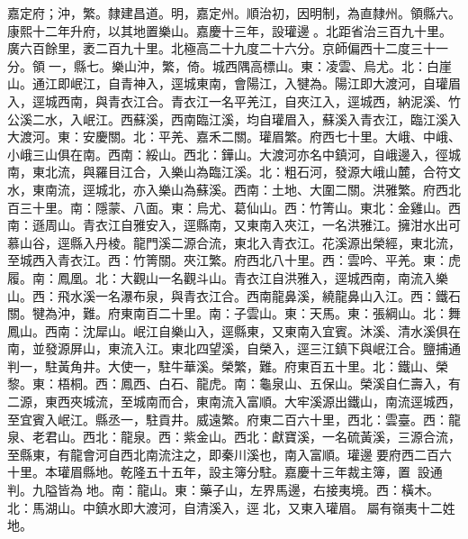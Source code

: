 \begin{pinyinscope}
嘉定府；沖，繁。隸建昌道。明，嘉定州。順治初，因明制，為直隸州。領縣六。康熙十二年升府，以其地置樂山。嘉慶十三年，設瓘邊。北距省治三百九十里。廣六百餘里，袤二百九十里。北極高二十九度二十六分。京師偏西十二度三十一分。領一，縣七。樂山沖，繁，倚。城西隅高標山。東：凌雲、烏尤。北：白崖山。通江即岷江，自青神入，逕城東南，會陽江，入犍為。陽江即大渡河，自瓘眉入，逕城西南，與青衣江合。青衣江一名平羌江，自夾江入，逕城西，納泥溪、竹公溪二水，入岷江。西蘇溪，西南臨江溪，均自瓘眉入，蘇溪入青衣江，臨江溪入大渡河。東：安慶關。北：平羌、嘉禾二關。瓘眉繁。府西七十里。大峨、中峨、小峨三山俱在南。西南：綏山。西北：鏵山。大渡河亦名中鎮河，自峨邊入，徑城南，東北流，與羅目江合，入樂山為臨江溪。北：粗石河，發源大峨山麓，合符文水，東南流，逕城北，亦入樂山為蘇溪。西南：土地、大圍二關。洪雅繁。府西北百三十里。南：隱蒙、八面。東：烏尤、葛仙山。西：竹箐山。東北：金雞山。西南：遜周山。青衣江自雅安入，逕縣南，又東南入夾江，一名洪雅江。擁泔水出可慕山谷，逕縣入丹棱。龍門溪二源合流，東北入青衣江。花溪源出榮經，東北流，至城西入青衣江。西：竹箐關。夾江繁。府西北八十里。西：雲吟、平羌。東：虎履。南：鳳凰。北：大觀山一名觀斗山。青衣江自洪雅入，逕城西南，南流入樂山。西：飛水溪一名瀑布泉，與青衣江合。西南龍鼻溪，繞龍鼻山入江。西：鐵石關。犍為沖，難。府東南百二十里。南：子雲山。東：天馬。東：張綱山。北：舞鳳山。西南：沈犀山。岷江自樂山入，逕縣東，又東南入宜賓。沐溪、清水溪俱在南，並發源屏山，東流入江。東北四望溪，自榮入，逕三江鎮下與岷江合。鹽捕通判一，駐黃角井。大使一，駐牛華溪。榮繁，難。府東百五十里。北：鐵山、榮黎。東：梧桐。西：鳳西、白石、龍虎。南：龜泉山、五保山。榮溪自仁壽入，有二源，東西夾城流，至城南而合，東南流入富順。大牢溪源出鐵山，南流逕城西，至宜賓入岷江。縣丞一，駐貢井。威遠繁。府東二百六十里，西北：雲臺。西：龍泉、老君山。西北：龍泉。西：紫金山。西北：獻寶溪，一名硫黃溪，三源合流，至縣東，有龍會河自西北南流注之，即秦川溪也，南入富順。瓘邊要府西二百六十里。本瓘眉縣地。乾隆五十五年，設主簿分駐。嘉慶十三年裁主簿，置，設通判。九隘皆為地。南：龍山。東：藥子山，左界馬邊，右接夷境。西：橫木。北：馬湖山。中鎮水即大渡河，自清溪入，逕北，又東入瓘眉。屬有嶺夷十二姓地。


\end{pinyinscope}
